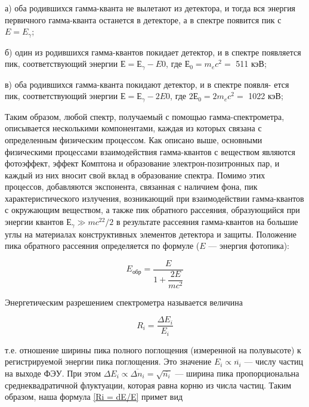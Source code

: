 \documentclass[12pt]{kiarticle}
\begin{document}
	а) оба родившихся гамма-кванта не вылетают из детектора, и тогда вся энергия первичного гамма-кванта останется в детекторе, а в спектре появится пик с $ E = E_\gamma $;
	
	б) один из родившихся гамма-квантов покидает детектор, и в спектре появляется пик, соответствующий энергии $  Е = Е_\gamma - E0 $, где $ Е_0 = m_ec^2 = $ 511 кэВ;
	
	в) оба родившихся гамма-кванта покидают детектор, и в спектре появля- ется пик, соответствующий энергии $  Е = Е_\gamma - 2E0 $, где $ 2Е_0 = 2m_ec^2 = $ 1022 кэВ;
	
	Таким образом, любой спектр, получаемый с помощью гамма-спектрометра, описывается несколькими компонентами, каждая из которых связана с определенным физическим процессом. Как описано выше, основными физическими процессами взаимодействия гамма-квантов с веществом являются фотоэффект, эффект Комптона и образование электрон-позитронных пар, и каждый из них вносит свой вклад в образование спектра. Помимо этих процессов, добавляются экспонента, связанная с наличием фона, пик характеристического излучения, возникающий при взаимодействии гамма-квантов с окружающим веществом, а также пик обратного рассеяния, образующийся при энергии квантов $ Е_\gamma \gg mc^22/2 $ в результате рассеяния гамма-квантов на большие углы на материалах конструктивных элементов детектора и защиты. Положение пика обратного рассеяния определяется по формуле ($ E $ --- энергия фотопика):
	
	\begin{equation}\label{Eobr}
		E_{обр} = \dfrac{E}{1 + \dfrac{2E}{mc^2}}
	\end{equation}

%	
	Энергетическим разрешением спектрометра называется величина
	
	\begin{equation}\label{Ri = dE/E}
	R_i = \dfrac{\Delta E_i}{E_i}
	\end{equation}
	
	т.е. отношение ширины пика полного поглощения (измеренной на полувысоте) к регистрируемой энергии пика поглощения. Это значение $ E_i \propto \overline{n_i} $ --- числу частиц на выходе ФЭУ. При этом  $ \Delta E_i \propto \overline{\Delta n_i} = \sqrt{\overline{n_i}} $ --- ширина пика пропорциональна среднеквадратичной флуктуации, которая равна корню из числа частиц. Таким образом, наша формула \eqref{Ri = dE/E} примет вид
	
\end{document}
